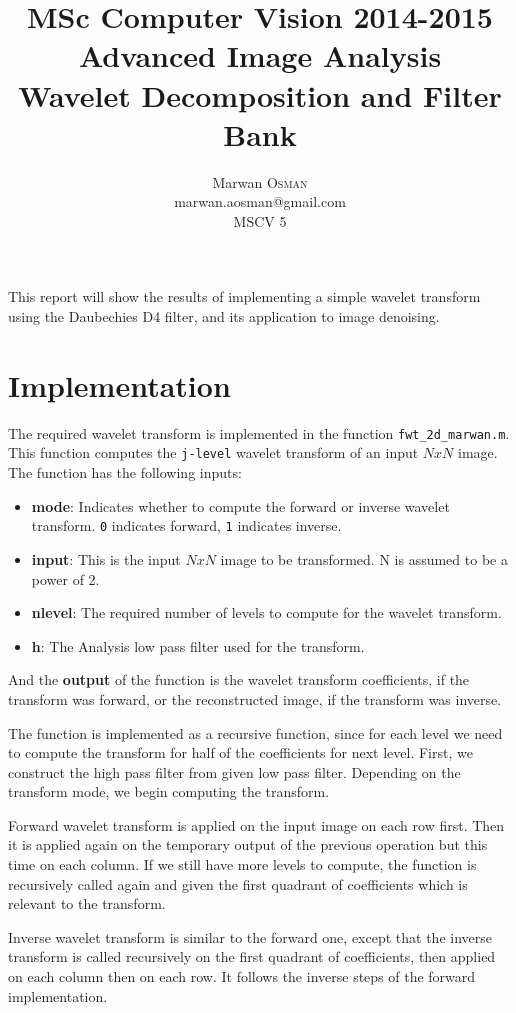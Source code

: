 \documentclass[a4paper,11pt]{article}
\title{MSc Computer Vision 2014-2015\\Advanced Image Analysis\\Wavelet Decomposition and Filter Bank}
\author{Marwan \textsc{Osman}\\ marwan.aosman@gmail.com\\ MSCV 5}
\date{}
\begin{document}
\maketitle

This report will show the results of implementing a simple wavelet transform using the Daubechies D4 filter, and its application to image denoising.

\section*{Implementation}
The required wavelet transform is implemented in the function \texttt{fwt\_2d\_marwan.m}. This function computes the \texttt{j-level} wavelet transform of an input $NxN$ image. The function has the following inputs:
\begin{itemize}
  \item \textbf{mode}: Indicates whether to compute the forward or inverse wavelet transform. \texttt{0} indicates forward, \texttt{1} indicates inverse.
  \item \textbf{input}: This is the input $NxN$ image to be transformed. N is assumed to be a power of 2.
  \item \textbf{nlevel}: The required number of levels to compute for the wavelet transform.
  \item \textbf{h}: The Analysis low pass filter used for the transform.
\end{itemize}

And the \textbf{output} of the function is the wavelet transform coefficients, if the transform was forward, or the reconstructed image, if the transform was inverse.

The function is implemented as a recursive function, since for each level we need to compute the transform for half of the coefficients for next level. First, we construct the high pass filter from given low pass filter. Depending on the transform mode, we begin computing the transform.

Forward wavelet transform is applied on the input image on each row first. Then it is applied again on the temporary output of the previous operation but this time on each column. If we still have more levels to compute, the function is recursively called again and given the first quadrant of coefficients which is relevant to the transform.

Inverse wavelet transform is similar to the forward one, except that the inverse transform is called recursively on the first quadrant of coefficients, then applied on each column then on each row. It follows the inverse steps of the forward implementation.
\end{document}
